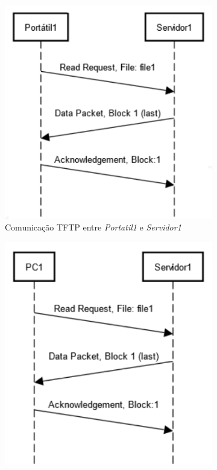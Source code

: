         \begin{figure}
            \vspace{-10pt}
             \centering
             \begin{subfigure}[b]{0.4\textwidth}
                 \centering
                 \includegraphics[width=\textwidth]{Imagens/9.png}
                 \caption*{Comunicação TFTP entre \textit{Portatil1} e \textit{Servidor1}}
             \end{subfigure}
             \hfill
             \begin{subfigure}[b]{0.4\textwidth}
                 \centering
                 \includegraphics[width=\textwidth]{Imagens/10.png}

\end{subfigure}
\end{figure}
